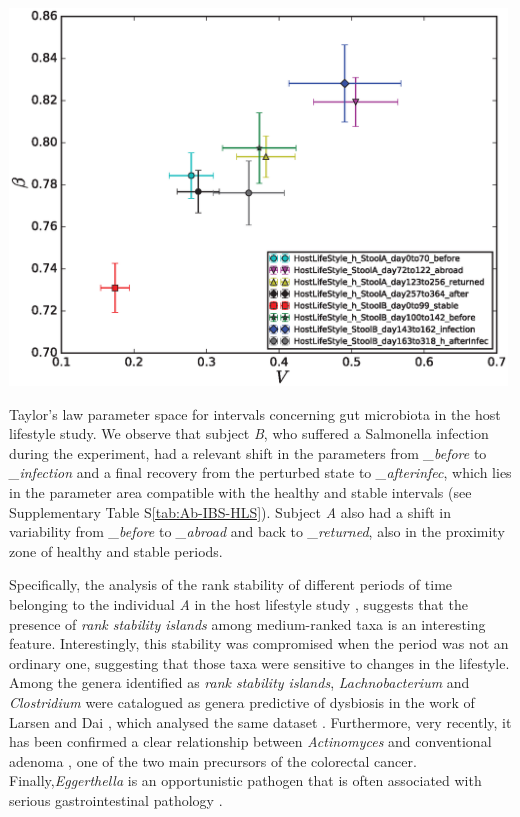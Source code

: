 \begin{supfig}
	\centering
	\includegraphics[width=0.99\textwidth]{figs/supfig_HLS_xWSummary.eps}
	\caption{Taylor's law parameter space for intervals concerning gut microbiota in the host lifestyle study\cite{hostlife}. We observe that subject \emph{B}, who suffered a Salmonella infection during the experiment, had a relevant shift in the parameters from \emph{\_before} to \emph{\_infection} and a final recovery from the perturbed state to \emph{\_afterinfec}, which lies in the parameter area compatible with the healthy and stable intervals (see Supplementary Table S\ref{tab:Ab-IBS-HLS}). Subject \emph{A} also had a shift in variability from \emph{\_before} to \emph{\_abroad} and back to \emph{\_returned}, also in the proximity zone of healthy and stable periods.}
	\label{supfig:HLS_xWSummary}
\end{supfig}
 
Specifically, the analysis of the rank stability of different periods of time belonging to the individual \emph{A} in the host lifestyle study \cite{hostlife}, suggests that the presence of \emph{rank stability islands} among medium-ranked taxa is an interesting feature. Interestingly, this stability was compromised when the period was not an ordinary one, suggesting that those taxa were sensitive to changes in the lifestyle. Among the genera identified as \emph{rank stability islands}, \emph{Lachnobacterium} and \emph{Clostridium} were catalogued as genera predictive of dysbiosis in the work of Larsen and Dai \cite{rsi_dysbiosis}, which analysed the same dataset \cite{hostlife}. Furthermore, very recently, it has been confirmed a clear relationship between \emph{Actinomyces} and conventional adenoma \cite{rsi_actino}, one of the two main precursors of the colorectal cancer. Finally,\emph{Eggerthella} is an opportunistic pathogen that is often associated with serious gastrointestinal pathology \cite{rsi_egg}.

